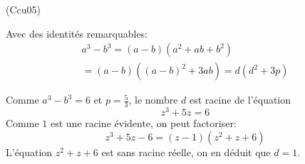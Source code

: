 \begin{tiny}(Ccu05)\end{tiny} Avec des identités remarquables:
\begin{multline*}
  a^3-b^3 = (a-b)(a^2+ab+b^2)\\ = (a-b)((a-b)^2+3ab) = d(d^2+3p)
\end{multline*}

Comme $a^3-b^3 = 6$ et $p = \frac{5}{3}$, le nombre $d$ est racine de l'équation
\begin{displaymath}
  z^3 + 5z = 6
\end{displaymath}
Comme $1$ est une racine évidente, on peut factoriser:
\begin{displaymath}
  z^3 + 5z -6 =(z-1)(z^2+z+6)
\end{displaymath}
L'équation $z^2+z+6$ est sans racine réelle, on en déduit que $d=1$.
